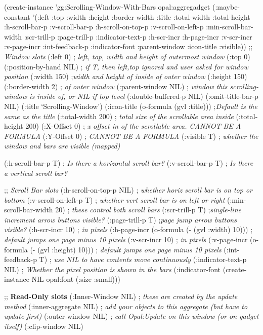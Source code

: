 \begin{programexample}
(create-instance 'gg:Scrolling-Window-With-Bars opal:aggregadget
   (:maybe-constant '(:left :top :width :height :border-width :title
                      :total-width :total-height :h-scroll-bar-p :v-scroll-bar-p
		      :h-scroll-on-top-p :v-scroll-on-left-p :min-scroll-bar-width
                      :scr-trill-p :page-trill-p :indicator-text-p :h-scr-incr
                      :h-page-incr :v-scr-incr :v-page-incr :int-feedback-p
                      :indicator-font :parent-window :icon-title :visible))
   ;; {\it Window slots}
   (:left 0)  ; {\it left, top, width and height of outermost window}
   (:top 0)
   (:position-by-hand NIL) ; {\it if T, then left,top ignored and user asked for window position}
   (:width 150) ;{\it width and height of inside of outer window}
   (:height 150)
   (:border-width 2) ; {\it of outer window}
   (:parent-window NIL) ; {\it window this scrolling-window is inside of, or NIL if top level}
   (:double-buffered-p NIL)
   (:omit-title-bar-p NIL)
   (:title `Scrolling-Window')
   (:icon-title (o-formula (gvl :title))) ;{\it Default is the same as the title}
   (:total-width 200)   ; {\it total size of the scrollable area inside}
   (:total-height 200)
   (:X-Offset 0)  ; {\it x offset in of the scrollable area. CANNOT BE A FORMULA}
   (:Y-Offset 0)  ; {\it CANNOT BE A FORMULA}
   (:visible T)  ; {\it whether the window and bars are visible (mapped)}

   (:h-scroll-bar-p T)  ; {\it Is there a horizontal scroll bar?}
   (:v-scroll-bar-p T)  ; {\it Is there a vertical scroll bar?}

   ;; {\it Scroll Bar slots}
   (:h-scroll-on-top-p NIL)  ; {\it whether horiz scroll bar is on top or bottom}
   (:v-scroll-on-left-p T)   ; {\it whether vert scroll bar is on left or right}
   (:min-scroll-bar-width 20) ; {\it these control both scroll bars}
   (:scr-trill-p T)  ;{\it single-line increment arrow buttons visible?}
   (:page-trill-p T) ;{\it page jump arrow buttons visible?}
   (:h-scr-incr 10)  ; {\it in pixels}
   (:h-page-incr (o-formula (- (gvl :width) 10))) ; {\it default jumps one page minus 10 pixels}
   (:v-scr-incr 10)  ; {\it in pixels}
   (:v-page-incr (o-formula (- (gvl :height) 10))) ; {\it default jumps one page minus 10 pixels}
   (:int-feedback-p T) ; {\it use NIL to have contents move continuously}
   (:indicator-text-p NIL) ; {\it Whether the pixel position is shown in the bars}
   (:indicator-font (create-instance NIL opal:font (:size :small)))

   ;; {\bf Read-Only slots}
   (:Inner-Window NIL)  ; {\it these are created by the update method}
   (:inner-aggregate NIL) ; {\it add your objects to this aggregate (but have to update first)}
   (:outer-window NIL) ; {\it call Opal:Update on this window (or on gadget itself)}
   (:clip-window NIL)

\end{programexample}


